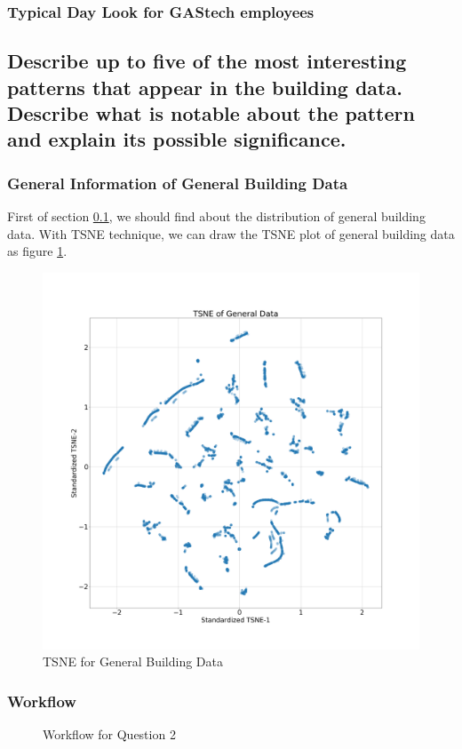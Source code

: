 \documentclass[aps, 10pt, a4paper]{article}
\begin{document}
            \subsubsection{Typical Day Look for GAStech employees}
        
        \subsection[Question 2]{Describe up to five of the most interesting patterns that appear in the building data. Describe what is notable about the pattern and explain its possible significance.}
            \label{sec:question2}
            \subsubsection{General Information of General Building Data}
                First of section \ref{sec:question2}, we should find about the distribution of general building data. With TSNE technique, we can draw the TSNE plot of general building data as figure \ref{fig:tsnegeneral}.
                
                \begin{figure}[htbp]
                    \centering
                    \includegraphics[width=0.4 \linewidth]{figures/TsneGeneral.png}
                    \caption{TSNE for General Building Data}
                    \label{fig:tsnegeneral}
                \end{figure}
            
            \subsubsection{Workflow}
                \begin{figure}[htbp]
                    \centering
                    \begin{tikzpicture}[node distance = 2cm, auto]
                    \end{tikzpicture}
                    \caption{Workflow for Question 2}
                    \label{fig:workflow2}
                \end{figure}
 
\end{document}
